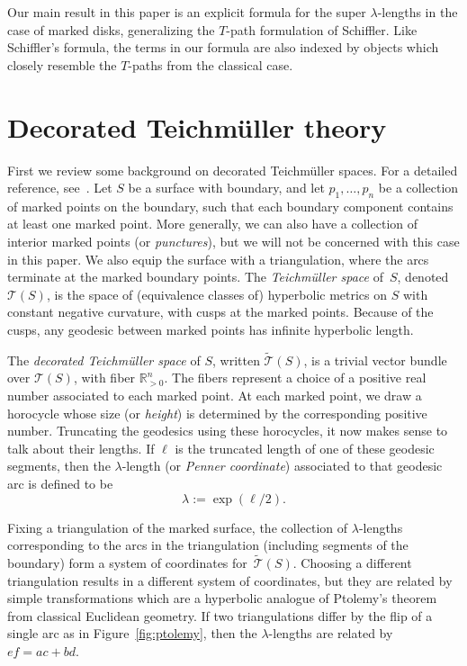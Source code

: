 \documentclass[pdftex]{sigma}
\numberwithin{equation}{section}
\begin{document}
Our main result in this paper is an explicit formula for the super $\lambda$-lengths in the case of marked disks, generalizing the $T$-path formulation of Schiffler.
 Like Schiffler's formula, the terms in our formula are also indexed by objects which closely resemble the $T$-paths from the classical case.

\section{Decorated Teichm\"uller theory}

First we review some background on decorated Teichm\"{u}ller spaces. For a detailed reference, see~\cite{penner_12}.
%
Let $S$ be a surface with boundary, and let $p_1,\dots,p_n$ be a collection of marked points on the boundary,
such that each boundary component contains at least one marked point. More generally, we can also have a collection of interior marked points (or \emph{punctures}),
but we will not be concerned with this case in this paper. We also equip the surface with a triangulation, where the arcs terminate
at the marked boundary points. The \emph{Teichm\"{u}ller space} of~$S$, denoted~$\mathcal{T}(S)$, is the space of (equivalence classes of) hyperbolic metrics on $S$ with constant negative
curvature, with cusps at the marked points. Because of the cusps, any geodesic between marked points has infinite hyperbolic length.

The \emph{decorated Teichm\"{u}ller space} of $S$, written $\widetilde{\mathcal{T}}(S)$, is a trivial vector bundle over $\mathcal{T}(S)$,
with fiber ${\mathbb R}_{> 0}^n$. The fibers represent a choice of a positive real number associated to each marked point.
At each marked point, we draw a horocycle whose size (or \emph{height}) is determined by the corresponding positive number.
Truncating the geodesics using these horocycles, it now makes sense to talk about their lengths. If $\ell$ is the truncated
length of one of these geodesic segments, then the $\lambda$-length (or \emph{Penner coordinate}) associated to that geodesic arc
is defined to be
\[ \lambda := \exp(\ell/2). \]

Fixing a triangulation of the marked surface, the collection of $\lambda$-lengths corresponding to the arcs in the triangulation (including segments
of the boundary) form a system of coordinates for~$\widetilde{\mathcal{T}}(S)$. Choosing a different triangulation results in a different
system of coordinates, but they are related by simple transformations which are a hyperbolic analogue of Ptolemy's theorem from classical Euclidean geometry.
If two triangulations differ by the flip of a single arc as in Figure~\ref{fig:ptolemy},
then the $\lambda$-lengths are related by $ef = ac + bd$.
\end{document}
